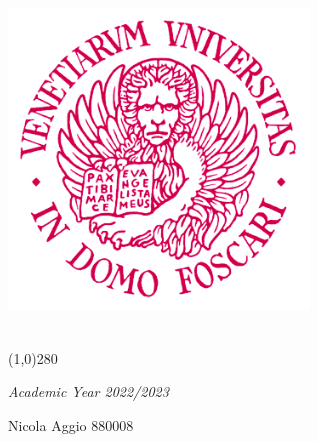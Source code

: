 \newcommand{\image}[3]{ %
	\begin{figure}[H]
		\centering
		\texttt{[image: \#1]} 
		\caption{#2}
	\end{figure}
	\FloatBarrier
}

\newcommand{\imageb}[2]{ %
	\begin{figure}[H]
		\centering
		\texttt{[image: \#1]} 
	\end{figure}
	\FloatBarrier
}

\newcommand{\imageLabel}[4]{ %
	\begin{figure}[H]
		\centering
		\texttt{[image: \#1]} 
		\caption{#2}
		\label{fig:#4}
	\end{figure}
	\FloatBarrier
}
\newcommand{\Z}{\mathbb{Z}}

\begin{titlepage}
	\begin{center}
		\includegraphics[width=0.6\textwidth]{logo}
		
		\vspace*{1cm}
		\LARGE
		
		\vspace{0.5cm}
		\Huge
		\textbf{\titolo}\\
		
		\line(1,0){280}
		
		\vspace{0.5cm}
		\large
		\textit{Academic Year 2022/2023}
		
		\vfill
		
	\end{center}
	\begin{raggedleft}
		\Large
		\large
		Nicola Aggio 880008\\
	\end{raggedleft}
\end{titlepage}

